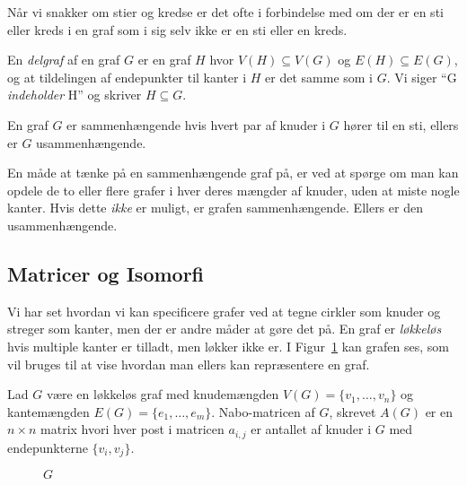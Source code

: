 Når vi snakker om stier og kredse er det ofte i forbindelse med om der er en sti eller kreds i en graf som i sig selv ikke er en sti eller en kreds.

\begin{definition}[Delgraf]
	En \textit{delgraf} af en graf $G$ er en graf $H$ hvor $V(H) \subseteq V(G)$ og $E(H) \subseteq E(G)$, og at tildelingen af endepunkter til kanter i $H$ er det samme som i $G$. Vi siger ``G \textit{indeholder} H'' og skriver $H \subseteq G$.
\end{definition}

\begin{definition}
	En graf $G$ er sammenhængende hvis hvert par af knuder i $G$ hører til en sti, ellers er $G$ usammenhængende.
\end{definition}

En måde at tænke på en sammenhængende graf på, er ved at spørge om man kan opdele de to eller flere grafer i hver deres mængder af knuder, uden at miste nogle kanter. Hvis dette \textit{ikke} er muligt, er grafen sammenhængende. Ellers er den usammenhængende.


\subsection{Matricer og Isomorfi}%
\label{subsec:label}

Vi har set hvordan vi kan specificere grafer ved at tegne cirkler som knuder og streger som kanter, men der er andre måder at gøre det på. En graf er \textit{løkkeløs} hvis multiple kanter er tilladt, men løkker ikke er. I Figur~\ref{fig:pp7g} kan grafen ses, som vil bruges til at vise hvordan man ellers kan repræsentere en graf.


\begin{definition}
	Lad $G$ være en løkkeløs graf med knudemængden $V(G) = \{v_{1}, \ldots, v_{n}\}$ og kantemængden $E(G) = \{e_{1}, \ldots, e_{m}\}$. Nabo-matricen af $G$, skrevet $A(G)$ er en $n \times n$ matrix hvori hver post i matricen $a_{i,j}$ er antallet af knuder i $G$ med endepunkterne $\{v_{i}, v_{j}\}$.
\end{definition}

\begin{figure}[H]
	\vspace{-20pt} %
	\centering
	\caption{\label{fig:pp7g} $G$}
\end{figure}



